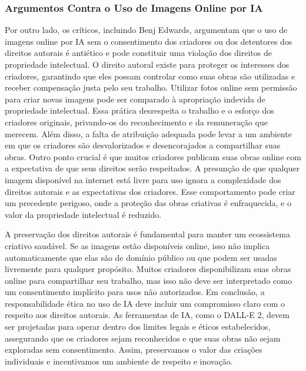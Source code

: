 \documentclass[referee,sn-basic]{sn-jnl}
\theoremstyle{thmstyleone}%
\begin{document}
\subsubsection{Argumentos Contra o Uso de Imagens Online por IA}
\hspace{0.7cm}Por outro lado, os críticos, incluindo Benj Edwards, argumentam que o uso de imagens online por IA sem o consentimento dos criadores ou dos detentores dos direitos autorais é antiético e pode constituir uma violação dos direitos de propriedade intelectual. O direito autoral existe para proteger os interesses dos criadores, garantindo que eles possam controlar como suas obras são utilizadas e receber compensação justa pelo seu trabalho. Utilizar fotos online sem permissão para criar novas imagens pode ser comparado à apropriação indevida de propriedade intelectual. Essa prática desrespeita o trabalho e o esforço dos criadores originais, privando-os do reconhecimento e da remuneração que merecem. Além disso, a falta de atribuição adequada pode levar a um ambiente em que os criadores são desvalorizados e desencorajados a compartilhar suas obras. Outro ponto crucial é que muitos criadores publicam suas obras online com a expectativa de que seus direitos serão respeitados. A presunção de que qualquer imagem disponível na internet está livre para uso ignora a complexidade dos direitos autorais e as expectativas dos criadores. Esse comportamento pode criar um precedente perigoso, onde a proteção das obras criativas é enfraquecida, e o valor da propriedade intelectual é reduzido.\par

A preservação dos direitos autorais é fundamental para manter um ecossistema criativo saudável. Se as imagens estão disponíveis online, isso não implica automaticamente que elas são de domínio público ou que podem ser usadas livremente para qualquer propósito. Muitos criadores disponibilizam suas obras online para compartilhar seu trabalho, mas isso não deve ser interpretado como um consentimento implícito para usos não autorizados. Em conclusão, a responsabilidade ética no uso de IA deve incluir um compromisso claro com o respeito aos direitos autorais. As ferramentas de IA, como o DALL-E 2, devem ser projetadas para operar dentro dos limites legais e éticos estabelecidos, assegurando que os criadores sejam reconhecidos e que suas obras não sejam exploradas sem consentimento. Assim, preservamos o valor das criações individuais e incentivamos um ambiente de respeito e inovação.\par
\end{document}
